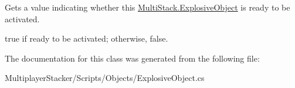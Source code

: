 Gets a value indicating whether this \hyperlink{class_multi_stack_1_1_explosive_object}{Multi\+Stack.\+Explosive\+Object} is ready to be activated. 

{\ttfamily true} if ready to be activated; otherwise, {\ttfamily false}.

The documentation for this class was generated from the following file\+:\begin{DoxyCompactItemize}
\item 
Multiplayer\+Stacker/\+Scripts/\+Objects/Explosive\+Object.\+cs\end{DoxyCompactItemize}
